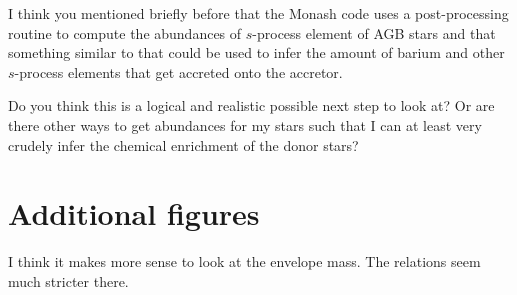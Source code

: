 \documentclass[a4paper,10pt]{article}
\begin{document}
I think you mentioned briefly before that the Monash code uses a post-processing routine to compute the abundances of \(s\)-process element of AGB stars and that something similar to that could be used to infer the amount of barium and other \(s\)-process elements that get accreted onto the accretor.

Do you think this is a logical and realistic possible next step to look at? Or are there other ways to get abundances for my stars such that I can at least very crudely infer the chemical enrichment of the donor stars?

\nextpage

\appendix
\section{Additional figures}
\begin{figure}[ht]
    \centering
\end{figure}

\begin{figure}[ht]
    \centering
\end{figure}

I think it makes more sense to look at the envelope mass. The relations seem much stricter there.

\begin{figure}[ht]
    \centering
\end{figure}
\end{document}
